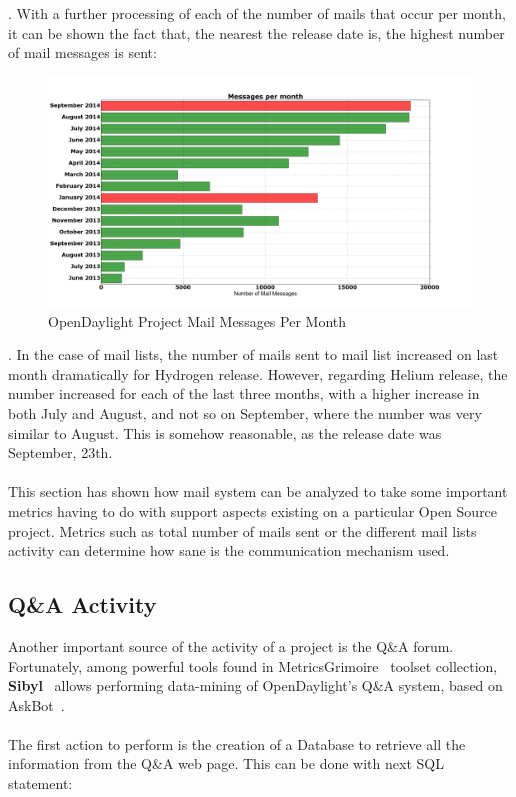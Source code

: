 \documentclass[a4paper, 12pt]{book}
\begin{document}
{. With a further processing of each of the number of mails that occur per month, it can be shown the fact that, the nearest the release date is, the highest number of mail messages is sent:
\begin{center}
 \begin{figure}[H]
 \begin{center}
   \includegraphics[width=17cm]{img/messages_month_01.png}
   \caption{OpenDaylight Project Mail Messages Per Month}
   \label{fig:odl_mails_month}
 \end{center}
 \end{figure}
\end{center}
. In the case of mail lists, the number of mails sent to mail list increased on last month dramatically for Hydrogen release. However, regarding Helium release, the number increased for each of the last three months, with a higher increase in both July and August, and not so on September, where the number was very similar to August. This is somehow reasonable, as the release date was September, 23th.\\
\\
This section has shown how mail system can be analyzed to take some important metrics having to do with support aspects existing on a particular Open Source project. Metrics such as total number of mails sent or the different mail lists activity can determine how sane is the communication mechanism used.

\subsection{Q\&A Activity}
Another important source of the activity of a project is the Q\&A forum. Fortunately, among powerful tools found in MetricsGrimoire~\cite{MetricsGrimore} toolset collection, \textbf{Sibyl}~\cite{Sibyl} allows performing data-mining of OpenDaylight's Q\&A system, based on AskBot~\cite{AskBot}.\\
\\
The first action to perform is the creation of a Database to retrieve all the information from the Q\&A web page. This can be done with next SQL statement:

}
\end{document}
